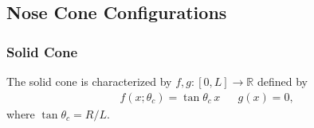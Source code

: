 \documentclass[11pt,dvipsnames]{thesis}
\begin{document}
\subsection{Nose Cone Configurations}
\subsubsection{Solid Cone}
The solid cone is characterized by $f, g : [0, L] \to \mathbb{R}$ defined by 
\begin{align}
f(x; \theta_c) = \tan\theta_c \,x && g(x) = 0,
\end{align}
where $\tan\theta_c = R/L$.
\end{document}
